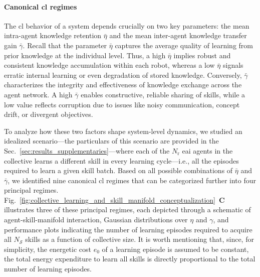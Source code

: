 \documentclass[12pt]{article}
\begin{document}
\paragraph*{Canonical \acl{cl} regimes}
The \acl{cl} behavior of a system depends crucially on two key parameters: the mean intra-agent knowledge retention $\bar{\eta}$ and the mean inter-agent knowledge transfer gain $\bar{\gamma}$. Recall that the parameter $\bar{\eta}$ captures the average quality of learning from prior knowledge at the individual level. Thus, a high $\bar{\eta}$ implies robust and consistent knowledge accumulation within each robot, whereas a low $\bar{\eta}$ signals erratic internal learning or even degradation of stored knowledge. Conversely, $\bar{\gamma}$ characterizes the integrity and effectiveness of knowledge exchange across the agent network. A high $\bar{\gamma}$ enables constructive, reliable sharing of skills, while a low value reflects corruption due to issues like noisy communication, concept drift, or divergent objectives.

To analyze how these two factors shape system-level dynamics, we studied an idealized scenario---the particulars of this scenario are provided in the  Sec.~\ref{sec:results_supplementaries}---where each of the $N_\mathrm{r}$ \ac{eai} agents in the collective learns a different skill in every learning cycle---i.e., all the episodes required to learn a given skill batch. Based on all possible combinations of $\bar{\eta}$ and $\bar{\gamma}$, we identified nine canonical \ac{cl} regimes that can be categorized further into four principal regimes. Fig.~\ref{fig:collective_learning_and_skill_manifold_conceptualization}~\textbf{C} illustrates three of these principal regimes, each depicted through a schematic of agent-skill-manifold interaction, Gaussian distributions over $\eta$ and $\gamma$, and performance plots indicating the number of learning episodes required to acquire all $N_\mathcal{S}$ skills as a function of collective size. It is worth mentioning that, since, for simplicity, the energetic cost $ e_0 $ of a learning episode is assumed to be constant, the total energy expenditure to learn all skills is directly proportional to the total number of learning episodes.
\end{document}
